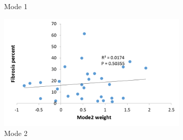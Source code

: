 \begin{figure}[H]
\begin{subfigure}{.65\linewidth}
  \caption{Mode 1}
  \label{fig:ShapeVSFibrosis-a} 
\end{subfigure} 
\begin{subfigure}{.65\linewidth}%
  \includegraphics[width=\linewidth,trim={{.0\wd0} {.0\wd0} {.0\wd0} {.0\wd0}},clip]{QuantitativeAnalysis/Image/Mode2AgainstFibrosis.png}
  \caption{Mode 2}
  \label{fig:ShapeVSFibrosis-b}
\end{subfigure}
\begin{subfigure}{.65\linewidth}%

\end{subfigure}
\end{figure}
